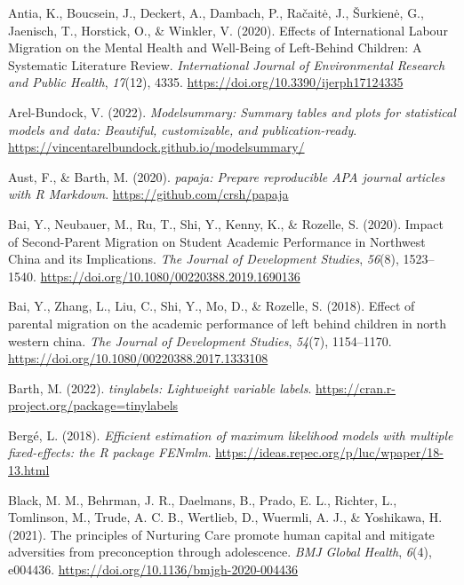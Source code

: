 \documentclass[
  man,floatsintext]{apa7}
\newlength{\cslhangindent}
\newlength{\cslentryspacingunit} %
\newenvironment{CSLReferences}[2] %
 {%
  \setlength{\parindent}{0pt}
  \ifodd #1
  \let\oldpar\par
  \def\par{\hangindent=\cslhangindent\oldpar}
  \fi
  \setlength{\parskip}{#2\cslentryspacingunit}
 }%
 {}
\begin{document}
\hypertarget{refs}{}
\begin{CSLReferences}{1}{0}
\leavevmode{}%
Antia, K., Boucsein, J., Deckert, A., Dambach, P., Račaitė, J., Šurkienė, G., Jaenisch, T., Horstick, O., \& Winkler, V. (2020). Effects of International Labour Migration on the Mental Health and Well-Being of Left-Behind Children: A Systematic Literature Review. \emph{International Journal of Environmental Research and Public Health}, \emph{17}(12), 4335. \url{https://doi.org/10.3390/ijerph17124335}

\leavevmode{}%
Arel-Bundock, V. (2022). \emph{Modelsummary: Summary tables and plots for statistical models and data: Beautiful, customizable, and publication-ready}. \url{https://vincentarelbundock.github.io/modelsummary/}

\leavevmode{}%
Aust, F., \& Barth, M. (2020). \emph{{papaja}: {Prepare} reproducible {APA} journal articles with {R Markdown}}. \url{https://github.com/crsh/papaja}

\leavevmode{}%
Bai, Y., Neubauer, M., Ru, T., Shi, Y., Kenny, K., \& Rozelle, S. (2020). Impact of Second-Parent Migration on Student Academic Performance in Northwest China and its Implications. \emph{The Journal of Development Studies}, \emph{56}(8), 1523--1540. \url{https://doi.org/10.1080/00220388.2019.1690136}

\leavevmode{}%
Bai, Y., Zhang, L., Liu, C., Shi, Y., Mo, D., \& Rozelle, S. (2018). Effect of parental migration on the academic performance of left behind children in north western china. \emph{The Journal of Development Studies}, \emph{54}(7), 1154--1170. \url{https://doi.org/10.1080/00220388.2017.1333108}

\leavevmode{}%
Barth, M. (2022). \emph{{tinylabels}: Lightweight variable labels}. \url{https://cran.r-project.org/package=tinylabels}

\leavevmode{}%
Bergé, L. (2018). \emph{Efficient estimation of maximum likelihood models with multiple fixed-effects: the R package FENmlm}. \url{https://ideas.repec.org/p/luc/wpaper/18-13.html}

\leavevmode{}%
Black, M. M., Behrman, J. R., Daelmans, B., Prado, E. L., Richter, L., Tomlinson, M., Trude, A. C. B., Wertlieb, D., Wuermli, A. J., \& Yoshikawa, H. (2021). The principles of Nurturing Care promote human capital and mitigate adversities from preconception through adolescence. \emph{BMJ Global Health}, \emph{6}(4), e004436. \url{https://doi.org/10.1136/bmjgh-2020-004436}


\end{CSLReferences}
\end{document}
